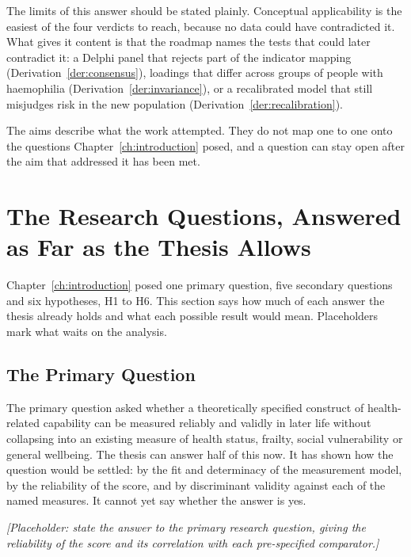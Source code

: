 The limits of this answer should be stated plainly. Conceptual applicability is
the easiest of the four verdicts to reach, because no data could have
contradicted it. What gives it content is that the roadmap names the tests that
could later contradict it: a Delphi panel that rejects part of the indicator
mapping (Derivation~\ref{der:consensus}), loadings that differ across groups of
people with haemophilia (Derivation~\ref{der:invariance}), or a recalibrated
model that still misjudges risk in the new population
(Derivation~\ref{der:recalibration}).

The aims describe what the work attempted. They do not map one to one onto the
questions Chapter~\ref{ch:introduction} posed, and a question can stay open
after the aim that addressed it has been met.

\section{The Research Questions, Answered as Far as the Thesis Allows}
\label{sec:conc-questions}

\noindent Chapter~\ref{ch:introduction} posed one primary question, five
secondary questions and six hypotheses, H1 to H6. This section says how much of
each answer the thesis already holds and what each possible result would mean.
Placeholders mark what waits on the analysis.

\subsection{The Primary Question}

The primary question asked whether a theoretically specified construct of
health-related capability can be measured reliably and validly in later life
without collapsing into an existing measure of health status, frailty, social
vulnerability or general wellbeing. The thesis can answer half of this now. It
has shown how the question would be settled: by the fit and determinacy of the
measurement model, by the reliability of the score, and by discriminant validity
against each of the named measures. It cannot yet say whether the answer is yes.

\medskip
\noindent\emph{[Placeholder: state the answer to the primary research question, giving the reliability of the score and its correlation with each pre-specified comparator.]}

